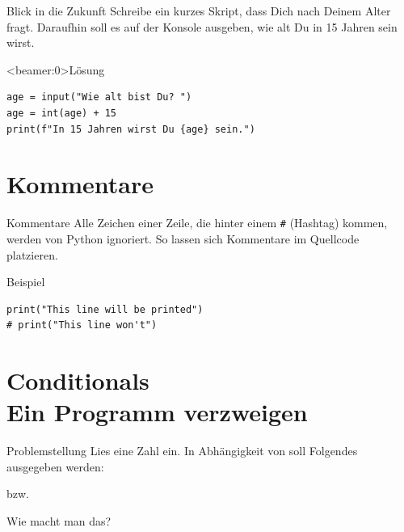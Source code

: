 \begin{fragile}[Übung]
\begin{block}{Blick in die Zukunft}
	\vspace{2pt}
Schreibe ein kurzes Skript, dass Dich nach Deinem Alter fragt. Daraufhin soll es auf der Konsole ausgeben, wie alt Du in 15 Jahren sein wirst. 
\end{block}
\vspace{12pt}
\begin{solutionblock}<beamer:0>{Lösung}
\begin{verbatim}
age = input("Wie alt bist Du? ")
age = int(age) + 15
print(f"In 15 Jahren wirst Du {age} sein.")
\end{verbatim}
\end{solutionblock}
\end{fragile}

\section{Kommentare}

\begin{fragile}


\begin{block}{Kommentare}
\vspace{2pt}
Alle Zeichen einer Zeile, die hinter einem \texttt{\#} (Hashtag) kommen, werden von Python ignoriert.
So lassen sich Kommentare im Quellcode platzieren. 
\end{block}

\vspace{12pt}

\pause
\begin{exampleblock}{Beispiel}
\begin{verbatim}
print("This line will be printed")
# print("This line won't") 
\end{verbatim}
\end{exampleblock}

\end{fragile}



\section{Conditionals \\ \footnotesize Ein Programm verzweigen}

\begin{frame}
	\begin{block}{Problemstellung}
		\vspace{2pt}
		Lies eine Zahl  ein. In Abhängigkeit von  soll Folgendes ausgegeben werden: 
		
		
		bzw. 
		
		\vspace{8pt}
		
		
		Wie macht man das?
		\end{block}
\end{frame}

